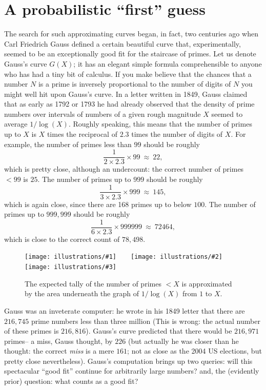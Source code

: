 \documentclass[11pt]{article}
\newcommand{\illthree}[5]{ 
   \begin{figure}[H]
   \begin{center}
   \texttt{[image: illustrations/\#1]}$\qquad$\texttt{[image: illustrations/\#2]}$\qquad$\texttt{[image: illustrations/\#3]}
   \caption{#5}
    \end{center}
    \end{figure}
}
\theoremstyle{plain}
\theoremstyle{definition}
\numberwithin{equation}{section}
\numberwithin{figure}{section}
\numberwithin{table}{section}
\begin{document}
\section{A probabilistic ``first'' guess }
The search for such approximating curves began, in fact, two centuries
ago when Carl Friedrich Gauss defined a certain beautiful curve that,
experimentally, seemed to be an exceptionally good fit for the
staircase of primes. Let us denote Gauss's curve $G(X)$; it has an
elegant simple formula comprehensible to anyone who has had a tiny bit
of calculus.  If you make believe that the chances that a number $N$ is
a prime is inversely proportional to the number of digits of $N$ you
might well hit upon Gauss's curve.   In a letter written in 1849, Gauss
claimed that as early as 1792 or 1793 he had already observed that the
density of prime numbers over intervals of numbers of a given rough
magnitude $X$ seemed to average $1/\log(X)$.  Roughly speaking, this
means that the number of primes up to $X$ is $X$ times the reciprocal 
of $2.3$ times the number of digits of $X$.  For example,
the number of primes less than $99$ should be roughly
$$
   {\frac{1}{2\times 2.3}}\times 99\ \approx \ 22,
$$   
which is pretty close, although an undercount: the correct number of
primes $< 99$ is $25$.  The number of primes up to $999$ should
be roughly
$$
   {\frac{1}{3\times 2.3}}\times 999\ \approx \ 145,
$$   
which is again close, since there are 168 primes up to below $100$. 
The number of primes up to $999,\!999$ should be roughly
$$
   {\frac{1}{6\times 2.3}}\times 999999\ \approx \ 72464,
$$   
which is close to the correct count of $78,\!498$.

\illthree{area_under_graph_30}{area_under_graph_100}{area_under_graph_1000}{.3}{The
  expected tally of the number of primes $<X$ is approximated by the
  area underneath the graph of $1/\log(X)$ from $1$ to $X$.}

           
Gauss was an inveterate computer: he wrote in his 1849 letter that
there are $216,\!745$ prime numbers less than three million (This is
wrong: the actual number of these primes is $216,\!816$). Gauss's curve
predicted that there would be $216,\!971$ primes-- a miss, Gauss
thought, by $226$ (but actually he was closer than he thought: the
correct {\em miss} is a mere $161$; not as close as the 2004 US
elections, but pretty close nevertheless).  
Gauss's computation brings up two queries: will this spectacular ``good
fit'' continue for arbitrarily large numbers? and, the (evidently
prior) question: what counts as a good fit?
\end{document}
